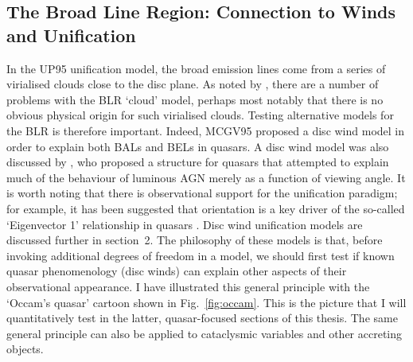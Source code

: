 \subsection{The Broad Line Region: Connection to Winds and Unification}
In the UP95 unification model, the broad emission lines
come from a series of virialised clouds close to the disc plane.
As noted by \citet[][hereafter MCGV95]{MCGV95}, there are a number of problems with
the BLR `cloud' model, perhaps most notably that there is no obvious 
physical origin for such virialised clouds. 
Testing alternative models for the BLR is therefore important.
Indeed, MCGV95 proposed a disc wind model in order to explain both BALs and BELs
in quasars. A disc wind model was also  discussed by \cite{elvis2000}, 
who proposed a structure for quasars that attempted to explain much 
of the behaviour of luminous AGN
merely as a function of viewing angle. It is worth noting that
there is observational support for the unification paradigm; for example,
it has been suggested that orientation is a key driver of the so-called
`Eigenvector 1' relationship in quasars 
\citep{borosongreen,sulentic2000ev1,marziani2001,shenho2014}.
Disc wind unification models are discussed further in section~2.
The philosophy of these models is that, before invoking additional
degrees of freedom in a model, we should first test if known quasar phenomenology 
(disc winds) can explain other aspects of their observational appearance.
I have illustrated this general principle with the `Occam's quasar' 
cartoon shown in Fig.~\ref{fig:occam}. This is the picture that I will
quantitatively test in the latter, quasar-focused sections of this thesis.
The same general principle can also be applied to cataclysmic variables 
and other accreting objects.


